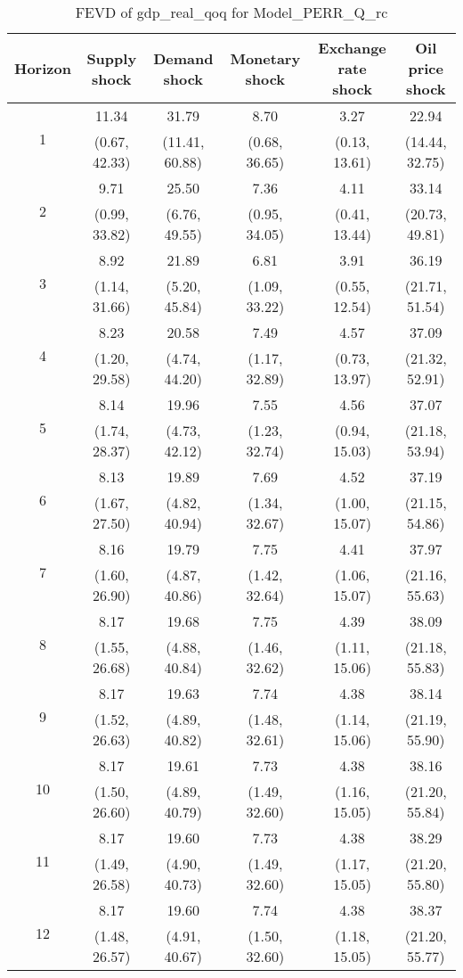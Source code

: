 \documentclass{article}
\begin{document}
\begin{table}
	\footnotesize
	\caption{FEVD of gdp_real_qoq for Model_PERR_Q_rc}
	\begin{tabular}{cccccc}
		Horizon & Supply shock & Demand shock & Monetary shock & Exchange rate shock & Oil price shock\\ \hline
		\multirow{2}{*}{1} & 11.34 & 31.79 & 8.70 & 3.27 & 22.94\\
		 & (0.67, 42.33) & (11.41, 60.88) & (0.68, 36.65) & (0.13, 13.61) & (14.44, 32.75)\\
		\multirow{2}{*}{2} & 9.71 & 25.50 & 7.36 & 4.11 & 33.14\\
		 & (0.99, 33.82) & (6.76, 49.55) & (0.95, 34.05) & (0.41, 13.44) & (20.73, 49.81)\\
		\multirow{2}{*}{3} & 8.92 & 21.89 & 6.81 & 3.91 & 36.19\\
		 & (1.14, 31.66) & (5.20, 45.84) & (1.09, 33.22) & (0.55, 12.54) & (21.71, 51.54)\\
		\multirow{2}{*}{4} & 8.23 & 20.58 & 7.49 & 4.57 & 37.09\\
		 & (1.20, 29.58) & (4.74, 44.20) & (1.17, 32.89) & (0.73, 13.97) & (21.32, 52.91)\\
		\multirow{2}{*}{5} & 8.14 & 19.96 & 7.55 & 4.56 & 37.07\\
		 & (1.74, 28.37) & (4.73, 42.12) & (1.23, 32.74) & (0.94, 15.03) & (21.18, 53.94)\\
		\multirow{2}{*}{6} & 8.13 & 19.89 & 7.69 & 4.52 & 37.19\\
		 & (1.67, 27.50) & (4.82, 40.94) & (1.34, 32.67) & (1.00, 15.07) & (21.15, 54.86)\\
		\multirow{2}{*}{7} & 8.16 & 19.79 & 7.75 & 4.41 & 37.97\\
		 & (1.60, 26.90) & (4.87, 40.86) & (1.42, 32.64) & (1.06, 15.07) & (21.16, 55.63)\\
		\multirow{2}{*}{8} & 8.17 & 19.68 & 7.75 & 4.39 & 38.09\\
		 & (1.55, 26.68) & (4.88, 40.84) & (1.46, 32.62) & (1.11, 15.06) & (21.18, 55.83)\\
		\multirow{2}{*}{9} & 8.17 & 19.63 & 7.74 & 4.38 & 38.14\\
		 & (1.52, 26.63) & (4.89, 40.82) & (1.48, 32.61) & (1.14, 15.06) & (21.19, 55.90)\\
		\multirow{2}{*}{10} & 8.17 & 19.61 & 7.73 & 4.38 & 38.16\\
		 & (1.50, 26.60) & (4.89, 40.79) & (1.49, 32.60) & (1.16, 15.05) & (21.20, 55.84)\\
		\multirow{2}{*}{11} & 8.17 & 19.60 & 7.73 & 4.38 & 38.29\\
		 & (1.49, 26.58) & (4.90, 40.73) & (1.49, 32.60) & (1.17, 15.05) & (21.20, 55.80)\\
		\multirow{2}{*}{12} & 8.17 & 19.60 & 7.74 & 4.38 & 38.37\\
		 & (1.48, 26.57) & (4.91, 40.67) & (1.50, 32.60) & (1.18, 15.05) & (21.20, 55.77)\\
	\end{tabular}
\label{tab:fevd-Model_PERR_Q_rc-gdp_real_qoq}
\end{table}
\end{document}
